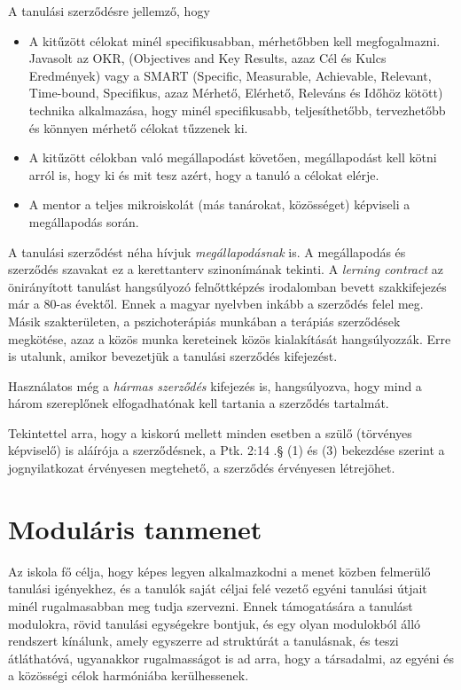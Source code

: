 A tanulási szerződésre jellemző, hogy
\begin{itemize}
\item A kitűzött célokat minél specifikusabban, mérhetőbben kell megfogalmazni. Javasolt az OKR,  (Objectives and Key Results, azaz  Cél és Kulcs Eredmények)\cite{okr} vagy a SMART (Specific, Measurable, Achievable, Relevant, Time-bound, Specifikus, azaz Mérhető, Elérhető, Releváns és Időhöz kötött)\cite{wiki:smart} technika alkalmazása, hogy minél specifikusabb, teljesíthetőbb, tervezhetőbb és könnyen mérhető célokat tűzzenek ki.

\item A kitűzött célokban való megállapodást követően, megállapodást  kell kötni arról is, hogy ki és mit tesz azért, hogy a tanuló a célokat elérje.

\item A mentor a teljes mikroiskolát (más tanárokat, közösséget) képviseli a megállapodás során.
\end{itemize}

A tanulási szerződést néha hívjuk \emph{megállapodásnak} is. A megállapodás és szerződés szavakat ez a kerettanterv szinonímának tekinti. A \emph{lerning contract} az önirányított tanulást hangsúlyozó felnőttképzés irodalomban
bevett szakkifejezés már a 80-as évektől\cite{Malcolm77}. Ennek a magyar nyelvben inkább a szerződés felel meg. Másik szakterületen, a pszichoterápiás munkában a terápiás szerződések megkötése, azaz a közös munka kereteinek közös kialakítását hangsúlyozzák.\cite{pszichoterapia} Erre is utalunk, amikor bevezetjük a tanulási szerződés kifejezést.

 Használatos még a \emph{hármas szerződés} kifejezés is, hangsúlyozva, hogy mind a három szereplőnek elfogadhatónak kell tartania a szerződés tartalmát.

Tekintettel arra, hogy a kiskorú mellett minden esetben a szülő (törvényes képviselő) is aláírója a szerződésnek, a Ptk. 2:14 .§ (1) és (3) bekezdése szerint a jognyilatkozat érvényesen megtehető, a szerződés érvényesen létrejöhet.

\section{Moduláris tanmenet}

Az iskola fő célja, hogy képes legyen alkalmazkodni a menet közben felmerülő tanulási igényekhez, és a tanulók saját céljai felé vezető egyéni tanulási útjait minél rugalmasabban meg tudja szervezni. Ennek támogatására a tanulást modulokra, rövid tanulási egységekre bontjuk, és egy olyan modulokból álló rendszert kínálunk, amely egyszerre ad struktúrát a tanulásnak, és teszi átláthatóvá, ugyanakkor rugalmasságot is ad arra, hogy a társadalmi, az egyéni és a közösségi célok harmóniába kerülhessenek.

